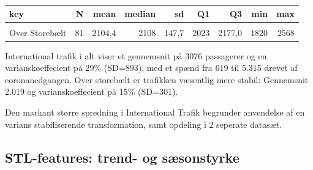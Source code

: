 \documentclass[
  danish,
]{article}
\begin{document}
\begin{table}
{\centering
\begin{tabular}[t]{lrrrrrrrr}
\toprule
key & N & mean & median & sd & Q1 & Q3 & min & max\\
\midrule
\cellcolor{gray!10}{International trafik i alt} & \cellcolor{gray!10}{81} & \cellcolor{gray!10}{3287,9} & \cellcolor{gray!10}{3237} & \cellcolor{gray!10}{677,9} & \cellcolor{gray!10}{2879} & \cellcolor{gray!10}{3584,2} & \cellcolor{gray!10}{1696} & \cellcolor{gray!10}{5315}\\
Over Storebælt & 81 & 2104,4 & 2108 & 147,7 & 2023 & 2177,0 & 1820 & 2568\\
\bottomrule
\end{tabular}

}

\end{table}%

International trafik i alt viser et gennemsnit på 3076 passagerer og en
varianskoeffecient på 29\% (SD=893), med et spænd fra 619 til 5.315
drevet af coronanedgangen. Over storebælt er trafikken væsentlig mere
stabil: Gennemsnit 2.019 og varianskoeffecient på 15\% (SD=301).

Den markant større spredning i International Trafik begrunder anvendelse
af en varians stabiliserende transformation, samt opdeling i 2 seperate
datasæt.

\newpage

\subsection{STL-features: trend- og
sæsonstyrke}\label{stl-features-trend--og-suxe6sonstyrke}
\end{document}
